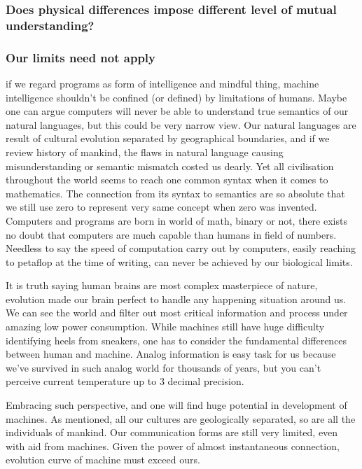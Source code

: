\documentclass[11pt]{article}
\begin{document}
\subsubsection{Does physical differences impose different level of mutual understanding?}

\subsubsection{Our limits need not apply}

if we regard programs  as form of intelligence and mindful thing, machine intelligence shouldn't be confined (or defined) by limitations of humans. Maybe one can argue computers will never be able to understand true semantics of our natural languages, but this could be very narrow view. Our natural languages are result of cultural evolution separated by geographical boundaries, and if we review history of mankind, the flaws in natural language causing misunderstanding or semantic mismatch costed us dearly. Yet all civilisation throughout the world seems to reach one common syntax when it comes to mathematics. The connection from its syntax to semantics are so absolute that we still use zero to represent very same concept when zero was invented. Computers and programs are born in world of math, binary or not, there exists no doubt that computers are much capable than humans in field of numbers. Needless to say the speed of computation carry out by computers, easily reaching to petaflop at the time of writing, can never be achieved by our biological limits. 

It is truth saying human brains are most complex masterpiece of nature, evolution made our brain perfect to handle any happening situation around us. We can see the world and filter out most critical information and process under amazing low power consumption. While machines still have huge difficulty identifying heels from sneakers, one has to consider the fundamental differences between human and machine. Analog information is easy task for us because we've survived in such analog world for thousands of years, but you can't perceive current temperature up to 3 decimal precision. 

Embracing such perspective, and one will find huge potential in development of machines. As mentioned, all our cultures are geologically separated, so are all the individuals of mankind. Our communication forms are still very limited, even with aid from machines. Given the power of almost instantaneous connection, evolution curve of machine must exceed ours. 




\end{document}
